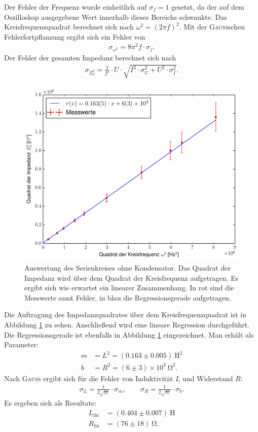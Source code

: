 \documentclass[12pt,a4paper,titlepage,headinclude]{scrartcl}
\numberwithin{equation}{subsection}
\newcommand{\mrm}[1]{\mathrm{#1}}
\newcommand{\person}[1]{\textsc{#1}}
\begin{document}
Der Fehler der Frequenz wurde einheitlich auf $\sigma_f=1$ gesetzt, da der auf dem Oszilloskop ausgegebene Wert innerhalb dieses Bereichs schwankte. Das Kreisfrequenzquadrat berechnet sich nach $\omega^2=\left( 2\pi f \right)^2$. Mit der \person{Gauss}schen Fehlerfortpflanzung ergibt sich ein Fehler von 
\begin{align}
	\sigma_{\omega^2}=8  \pi^{2}  f\cdot \sigma_{f}.
	\label{eq:sigmaomega}
\end{align}
 Der Fehler der gesamten Impedanz berechnet sich nach
\begin{align}
	\sigma_{Z_0^2}=\frac{2}{I^{3}} \cdot U \cdot \sqrt{I^{2} \cdot \sigma_{U}^{2} + U^{2} \cdot \sigma_{I}^{2}}.
	\label{eq:sigmaz0}
\end{align}
\begin{figure}[h!]
	\centering
	\includegraphics[width=\textwidth]{plot1.pdf}
	\caption{Auswertung des Serienkreises ohne Kondensator. Das Quadrat der Impedanz wird über dem Quadrat der Kreisfrequenz aufgetragen. Es ergibt sich wie erwartet ein linearer Zusammenhang. In rot sind die Messwerte samt Fehler, in blau die Regressionsgerade aufgetragen.}
	\label{fig:plot1}
\end{figure}
Die Auftragung des Impedanzquadrates über dem Kreisfrequenzquadrat ist in Abbildung \ref{fig:plot1} zu sehen. Anschließend wird eine lineare Regression durchgeführt. Die Regressionsgerade ist ebenfalls in Abbildung \ref{fig:plot1} eingezeichnet. Man erhält als Parameter:
\begin{align}
	m&=L^2=(0.163\pm0.005)~\mrm{H}^2\\
	b&=R^2=(6\pm3)\times 10^3~\mrm{\Omega}^2.
	\label{eq:plot1}
\end{align}
Nach \person{Gauss} ergibt sich für die Fehler von Induktivität $L$ und Widerstand $R$:
\begin{align}
	\sigma_L=\frac{1}{2\sqrt{m}}\cdot\sigma_m,\qquad\sigma_R=\frac{1}{2\sqrt{m}}\cdot\sigma_b.
	\label{eq:sigma1}
\end{align}
Es ergeben sich als Resultate:
\begin{align}
	L_{\mrm{lin}}&=(0.404\pm0.007)~\mrm{H}\\
	R_{\mrm{lin}}&=(76\pm18)~\mrm{\Omega}.
	\label{eq:result1}
\end{align}
\newpage
\end{document}
